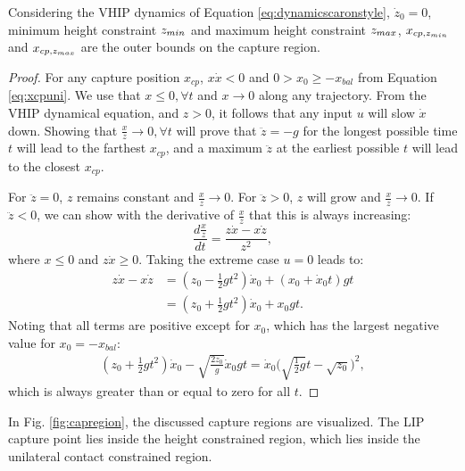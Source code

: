\begin{lem}\label{lem:regionz}
Considering the \ac{VHIP} dynamics of Equation \ref{eq:dynamicscaronstyle}, $\dot{z}_0=0$, minimum height constraint $z_{min}$ and maximum height constraint $z_{max}$, $x_{cp,z_{min}}$ and $x_{cp,z_{max}}$ are the outer bounds on the capture region.
\end{lem}
\begin{proof}
For any capture position $x_{cp}$, $x\dot{x}<0$ \cite{koolen2016balance} and $0>x_0\geq-x_{bal}$ from Equation \ref{eq:xcpuni}. 
We use that $x \leq 0, \forall t$ and $x\rightarrow 0$ along any trajectory. From the \ac{VHIP} dynamical equation, and $z>0$, it follows that any input $u$ will slow $\dot{x}$ down. Showing that $\frac{x}{z}\rightarrow 0, \forall t$ will prove that $\ddot{z}=-g$ for the longest possible time $t$ will lead to the farthest $x_{cp}$, and a maximum $\ddot{z}$ at the earliest possible $t$ will lead to the closest $x_{cp}$. 

For $\ddot{z}=0$, $z$ remains constant and $\frac{x}{z}\rightarrow 0$. For $\ddot{z}>0$, $z$ will grow and $\frac{x}{z}\rightarrow 0$. If $\ddot{z}<0$, we can show with the derivative of $\frac{x}{z}$ that this is always increasing:
\begin{equation}
\frac{d\frac{x}{z}}{dt}= \frac{z\dot{x}-x\dot{z}}{z^2},
\end{equation}
where $x \leq 0$ and $z \dot{x} \geq 0$. Taking the extreme case $u=0$ leads to:
\begin{align}
	z\dot{x}-x\dot{z} &= (z_0 - \frac{1}{2}gt^2)\dot{x}_0 + (x_0 + \dot{x}_0 t)gt\\
	&= (z_0 +\frac{1}{2}gt^2)\dot{x}_0 + x_0gt.
\end{align}
Noting that all terms are positive except for $x_0$, which has the largest negative value for $x_0=-x_{bal}$:
\begin{align}
	(z_0 +\frac{1}{2}gt^2)\dot{x}_0 - \sqrt{\frac{2z_0}{g}}\dot{x}_0gt = \dot{x}_0\bigg(\sqrt{\frac{1}{2}g}t - \sqrt{z_0}\bigg)^2,
\end{align}
which is always greater than or equal to zero for all $t$.
\end{proof}
In Fig. \ref{fig:capregion}, the discussed capture regions are visualized. The LIP capture point lies inside the height constrained region, which lies inside the unilateral contact constrained region.
